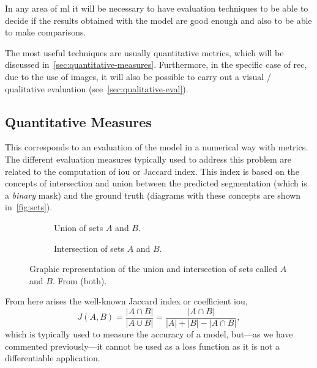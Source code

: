In any area of \gls{ml} it will be necessary to have evaluation techniques to
be able to decide if the results obtained with the model are good enough and
also to be able to make comparisons.

The most useful techniques are usually quantitative metrics, which will be
discussed in\ \vref{sec:quantitative-measures}. Furthermore, in the specific
case of \gls{rec}, due to the use of images, it will also be possible to carry
out a visual / qualitative evaluation (see\ \vref{sec:qualitative-eval}).


\subsection{Quantitative Measures}\label{sec:quantitative-measures}

This corresponds to an evaluation of the model in a numerical way with
metrics. The different evaluation measures typically used to address this
problem are related to the computation of \gls{iou} or Jaccard
index. This index is based on the concepts of intersection
and union between the predicted segmentation (which is a \emph{binary} mask)
and the ground truth (diagrams with these concepts are shown in\
\vref{fig:sets}).

\begin{figure}[ht]
  \begin{subfigure}[t]{.5\textwidth}
    \centering
    \caption{Union of sets \(A\) and \(B\).}
    
  \end{subfigure}\hfill
  \begin{subfigure}[t]{.5\textwidth}
    \centering
    \caption{Intersection of sets \(A\) and \(B\).}
    
  \end{subfigure}
  \caption[Union and intersection of sets \(A\) and \(B\)]{Graphic
    representation of the union and intersection of sets called \(A\) and
    \(B\). From \figcite{contributors21:jaccar} (both).}%
  \label{fig:sets}
\end{figure}

From here arises the well-known Jaccard index or
coefficient \gls{iou},
\begin{equation}
  J(A,B) = \frac{|A \cap B|}{|A \cup B|} =
  \frac{|A \cap B|}{|A| + |B| - |A \cap B|},
\end{equation}
which is typically used to measure the accuracy of a model, but---as we have
commented previously---it cannot be used as a loss function as it is not a
differentiable application.

